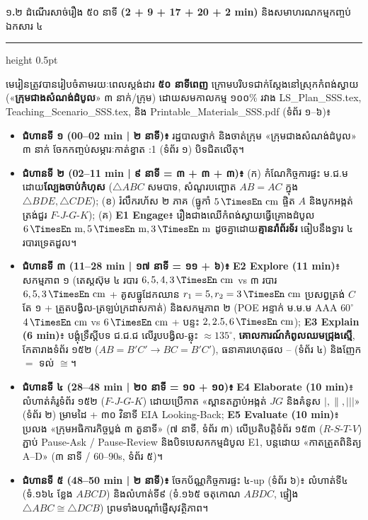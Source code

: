 \documentclass[a4paper,12pt]{article}
\newcommand{\en}[1]{{\TimesEn #1}}
\newcommand{\enbf}[1]{{\TimesEn\textbf{#1}}}
\newcommand{\unit}[1]{\,\text{\en{#1}}}
\newcommand{\cnum}[1]{\text{\fontsize{10.5pt}{12pt}\selectfont\ding{\numexpr181+#1\relax}}}
\newcommand{\tri}[1]{\ensuremath{\triangle #1}}
\newcommand{\cg}{\ensuremath{\cong}}
\newcommand{\subsectitle}[1]{{\muol\fontsize{11pt}{14.5pt}\selectfont #1}}
\newcommand{\subsec}[1]{%
  \needspace{1.6cm}%
  \vspace{4pt}%
  \subsectitle{#1}\par
  \vspace{2pt}\hrule height 0.5pt\vspace{3pt}%
}
\begin{document}
\subsec{១\enbf{.}២ ដំណើរសាច់រឿង ៥០ នាទី \enbf{(2 + 9 + 17 + 20 + 2 min)} និងសមាហរណកម្មកញ្ចប់ឯកសារ ៤}

មេរៀនត្រូវបានរៀបចំតាមរយៈពេលស្តង់ដារ \textbf{៥០ នាទីពេញ} ក្រោមបរិបទជាក់ស្ដែងនៅស្រុកកំពង់ស្វាយ («\textbf{ក្រុមជាងសំណង់ដំបូល}» ៣ នាក់/ក្រុម) ដោយសមកាលកម្ម ១០០\% រវាង \en{LS\_\allowbreak Plan\_\allowbreak SSS.tex}, \en{Teaching\_\allowbreak Scenario\_\allowbreak SSS.tex}, និង \en{Printable\_\allowbreak Materials\_\allowbreak SSS.pdf} (ទំព័រ ១--៦)៖
\begin{itemize}[leftmargin=0.55cm, topsep=1pt, itemsep=1.5pt, parsep=0pt]
  \item \textbf{ជំហានទី ១ (00--02 min | ២ នាទី)៖} រដ្ឋបាលថ្នាក់ និងចាត់ក្រុម «ក្រុមជាងសំណង់ដំបូល» ៣ នាក់ ចែកកញ្ចប់សម្ភារៈកាត់ខ្នាត \en{1:1} (ទំព័រ ១) បិទជិតលើតុ។
  \item \textbf{ជំហានទី ២ (02--11 min | ៩ នាទី = ៣ + ៣ + ៣)៖} (ក) កំណែកិច្ចការផ្ទះ ម.ជ.ម ដោយ\textbf{ល្បែងចាប់កំហុស} ($\tri{ABC}$ សមបាទ, សំណួរបញ្ឆោត $AB=AC$ ក្នុង $\tri{BDE}, \tri{CDE}$); (ខ) រំលឹករហ័ស ២ ភាគ (ធ្នូកាំ $5\unit{cm}$ ផ្ចិត $A$ និងបូកអង្កត់ត្រង់ជួរ $F\text{-}J\text{-}G\text{-}K$); (គ) \textbf{\en{E1 Engage}}៖ រឿងជាងឈើកំពង់ស្វាយធ្វើគ្រោងដំបូល $6\unit{m}, 5\unit{m}, 3\unit{m}$ ដូចគ្នាដោយ\textbf{គ្មានរ៉ាព័រទ័រ} ធៀបនឹងទ្វារ ៤ របារទ្រេតដួល។
  \item \textbf{ជំហានទី ៣ (11--28 min | ១៧ នាទី = ១១ + ៦)៖} \textbf{\en{E2 Explore (11 min)}}៖ សកម្មភាព ១ (តេស្តស៊ុម ៤ របារ $6,5,4,3\unit{cm}$ vs ៣ របារ $6,5,3\unit{cm}$ + គូសធ្នូដែកឈាន $r_1=5, r_2=3\unit{cm}$ ប្រសព្វត្រង់ $C$ តែ ១ + ត្រួតបង្វិល-ត្រឡប់ក្រដាសកាត់) និងសកម្មភាព ២ (\en{POE} អន្ទាក់ ម.ម.ម \en{AAA} $60^\circ$ $4\unit{cm}$ vs $6\unit{cm}$ + បន្ទះ $2, 2.5, 6\unit{cm}$); \textbf{\en{E3 Explain (6 min)}}៖ បង្គុំទ្រឹស្ដីបទ ជ.ជ.ជ លើរូបបង្វិល-ឆ្លុះ $\approx 135^\circ$, \textbf{គោលការណ៍កំពូលឈមជ្រុងស្មើ}, កែតារាងទំព័រ ១៥២ ($AB=B'C' \to BC=B'C'$), ធនាគារហេតុផល \cnum{1}--\cnum{5} (ទំព័រ ៤) និងញែក $=$ ទល់ $\cg$។
  \item \textbf{ជំហានទី ៤ (28--48 min | ២០ នាទី = ១០ + ១០)៖} \textbf{\en{E4 Elaborate (10 min)}}៖ លំហាត់គំរូទំព័រ ១៥២ ($F\text{-}J\text{-}G\text{-}K$) ដោយប្រើកាត «ស្ពានតភ្ជាប់អង្កត់ $JG$ និងគំនូស $|, \parallel, |||$» (ទំព័រ ២) ម្រាមដៃ \en{[tracing]} + ៣០ វិនាទី \en{EIA Looking-Back}; \textbf{\en{E5 Evaluate (10 min)}}៖ ប្រលង «ក្រុមអធិការកិច្ចប្លង់ ៣ តួនាទី» (៧ នាទី, ទំព័រ ៣) លើប្រតិបត្តិទំព័រ ១៥៣ ($R\text{-}S\text{-}T\text{-}V$) ភ្ជាប់ \en{Pause-Ask / Pause-Review} និងបិទបេសកកម្មដំបូល \en{E1}, បន្តដោយ «កាតត្រួតពិនិត្យ \en{A--D}» (៣ នាទី / 60--90s, ទំព័រ ៥)។
  \item \textbf{ជំហានទី ៥ (48--50 min | ២ នាទី)៖} ចែកប័ណ្ណកិច្ចការផ្ទះ ៤-up (ទំព័រ ៦)៖ លំហាត់ទី៤ (ទំ.១៦៤ ខ្លែង $ABCD$) និងលំហាត់ទី៩ (ទំ.១៦៥ ចតុកោណ $ABDC$, ផ្ទៀង $\tri{ABC}\cg\tri{DCB}$) ព្រមទាំងបណ្ដាំផ្ញើសុវត្ថិភាព។
\end{itemize}
\end{document}
